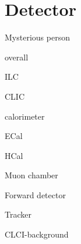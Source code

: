 \chapter{Detector}
\label{chap:Detector}

%
{Mysterious person}%

overall

ILC

CLIC

calorimeter

ECal

HCal

Muon chamber

Forward detector

Tracker

CLCI-background